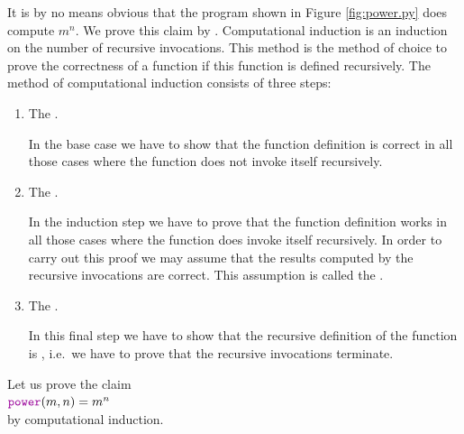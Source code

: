 It is by no means obvious that the program shown in Figure \ref{fig:power.py} does compute
$m^n$.  We prove this claim by  .
Computational induction is an induction on the number of recursive invocations.
This method is the method of choice to prove the correctness of a function if this function is defined recursively.
The method of computational induction consists of three steps:
\begin{enumerate}
\item The .

      In the base case we have to show that the function definition is correct in all those cases where the function
      does not invoke itself recursively.
\item The .

      In the induction step we have to prove that the function definition works in all those cases where
      the function does invoke itself recursively.  In order to carry out this proof we may
      assume that the results computed by the recursive invocations are correct.
      This assumption is called the .
\item The .

      In this final step we have to show that the recursive definition of the function is ,
      i.e.~we have to prove that the recursive invocations terminate.
\end{enumerate}
Let us prove the claim 
\\[0.2cm]
\hspace*{1.3cm}
 $\mytt{power}(m,n) = m^n$
\\[0.2cm] 
by computational induction.
